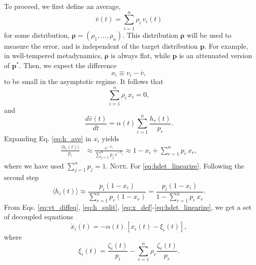 \documentclass[reprint, floatfix]{revtex4-1}
\newcommand{\note}[1]{{\color{DarkGreen}\footnotesize \textsc{Note.} #1}}
\begin{document}
To proceed, we first define an average\cite{
dama2014},
\begin{equation}
  \bar v(t)
  = \sum_{i = 1}^n \rho_i \, v_i(t)
\label{eq:vbar_def}
\end{equation}
for some distribution,
$\pmb \rho = (\rho_1, \dots, \rho_n)$.
%
This distribution $\pmb \rho$
will be used to measure the error,
and is independent of
the target distribution $\mathbf p$.
%
For example,
in well-tempered metadynamics,
$\pmb\rho$ is always flat,
while $\mathbf p$ is an attenuated version of
$\mathbf p^*$\cite{
barducci2008, dama2014}.
%
Then, we expect the difference %
%
\begin{equation}
  x_i \equiv v_i - \bar v
  ,
\label{eq:x_def}
\end{equation}
%
to be small in the asymptotic regime.
%
It follows that
\begin{equation}
  \sum_{i = 1}^n \rho_i \, x_i = 0
  ,
\label{eq:rhox_sum}
\end{equation}
and
\begin{equation}
  \frac{ d \bar v (t) }
       { d t }
  =
  \alpha(t)
  \sum_{ r = 1 }^n \frac{ h_r(t) } { p_r }
  .
\label{eq:dvbardt}
\end{equation}
%
Expanding Eq. \eqref{eq:h_ave} in $x_i$ yields
%
\begin{align}
  \frac{
    \langle h_i(t) \rangle
  }
  {
    p_i
  }
  &\approx
  \frac{                        e^{- x_i} }
       { \sum_{ j = 1}^n p_j \, e^{- x_j} }
  \approx
  1 - x_i + \sum_{r = 1}^n p_r \, x_r
  ,
\label{eq:hdet_linearize}
\end{align}
%
where we have used $\sum_{j=1}^n p_j = 1$.
%
\note{For \eqref{eq:hdet_linearize}. Following the second step
$$
\langle h_i(t) \rangle
\approx
\frac{                  p_i (1 - x_i) }
     { \sum_{ r = 1 }^n p_r (1 - x_r) }
=
\frac{                      p_i (1 - x_i) }
     { 1 - \sum_{ r = 1 }^n p_r \, x_r }
.
$$
}%
From Eqs.
\eqref{eq:vt_diffeq},
\eqref{eq:h_split},
\eqref{eq:x_def}-\eqref{eq:hdet_linearize},
we get a set of decoupled equations
%
\begin{equation}
  \dot x_i(t)
  =
  -\alpha(t) \, \left[ x_i(t) - \xi_i(t) \right]
  ,
\label{eq:dxdt_WL}
\end{equation}
where
\begin{equation}
  \xi_i(t)
  =
  \frac{ \zeta_i(t) }
       { p_i }
  -
  \sum_{ r = 1 }^n
    \rho_r
    \frac{ \zeta_r(t) }
         {     p_r    }
  .
\label{eq:xi_def}
\end{equation}
\end{document}
